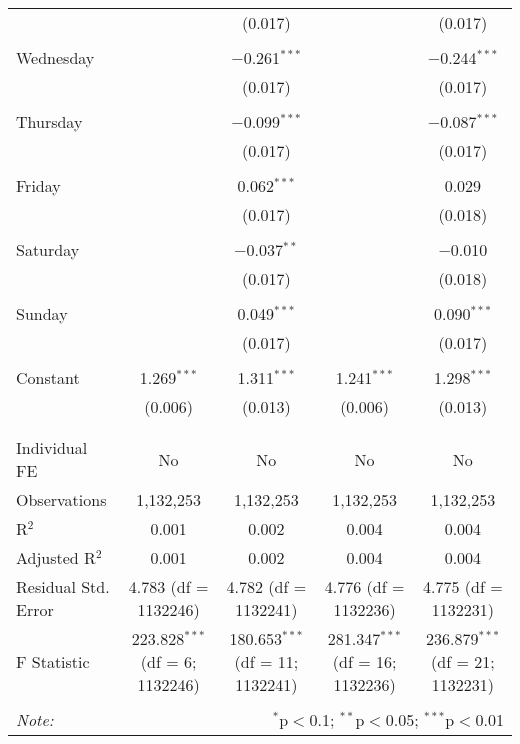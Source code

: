 \documentclass[
]{article}
\begin{document}
\begin{table}[!htbp]
{\begin{tabular}{@{\extracolsep{5pt}}lcccc}
  &  & (0.017) &  & (0.017) \\ 
  & & & & \\ 
 Wednesday &  & $-$0.261$^{***}$ &  & $-$0.244$^{***}$ \\ 
  &  & (0.017) &  & (0.017) \\ 
  & & & & \\ 
 Thursday &  & $-$0.099$^{***}$ &  & $-$0.087$^{***}$ \\ 
  &  & (0.017) &  & (0.017) \\ 
  & & & & \\ 
 Friday &  & 0.062$^{***}$ &  & 0.029 \\ 
  &  & (0.017) &  & (0.018) \\ 
  & & & & \\ 
 Saturday &  & $-$0.037$^{**}$ &  & $-$0.010 \\ 
  &  & (0.017) &  & (0.018) \\ 
  & & & & \\ 
 Sunday &  & 0.049$^{***}$ &  & 0.090$^{***}$ \\ 
  &  & (0.017) &  & (0.017) \\ 
  & & & & \\ 
 Constant & 1.269$^{***}$ & 1.311$^{***}$ & 1.241$^{***}$ & 1.298$^{***}$ \\ 
  & (0.006) & (0.013) & (0.006) & (0.013) \\ 
  & & & & \\ 
\hline \\[-1.8ex] 
Individual FE & No & No & No & No \\ 
Observations & 1,132,253 & 1,132,253 & 1,132,253 & 1,132,253 \\ 
R$^{2}$ & 0.001 & 0.002 & 0.004 & 0.004 \\ 
Adjusted R$^{2}$ & 0.001 & 0.002 & 0.004 & 0.004 \\ 
Residual Std. Error & 4.783 (df = 1132246) & 4.782 (df = 1132241) & 4.776 (df = 1132236) & 4.775 (df = 1132231) \\ 
F Statistic & 223.828$^{***}$ (df = 6; 1132246) & 180.653$^{***}$ (df = 11; 1132241) & 281.347$^{***}$ (df = 16; 1132236) & 236.879$^{***}$ (df = 21; 1132231) \\ 
\hline 
\hline \\[-1.8ex] 
\textit{Note:}  & \multicolumn{4}{r}{$^{*}$p$<$0.1; $^{**}$p$<$0.05; $^{***}$p$<$0.01} \\ 
\end{tabular}
} 
\end{table} 
\newpage
\end{document}
